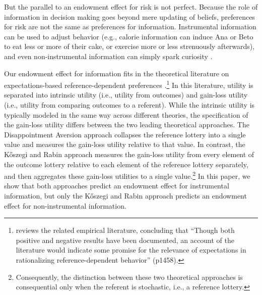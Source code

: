 But the parallel to an endowment effect for risk is not perfect. Because the role of information in decision making goes beyond mere updating of beliefs, preferences for risk are not the same as preferences for information. Instrumental information can be used to adjust behavior (e.g., calorie information can induce Ana or Beto to eat less or more of their cake, or exercise more or less strenuously afterwards), and even non-instrumental information can simply spark curiosity \citep{loewensteinPsychologyCuriosityReview1994,sharotHowPeopleDecide2020}.

Our endowment effect for information fits in the theoretical literature on expectations-based reference-dependent preferences \citep{marzilliericsonEndowmentEffect2014,odonoghueChapterReferenceDependentPreferences2018}.\footnote{\citet{sprengerEndowmentEffectRisk2015} reviews the related empirical literature, concluding that \enquote{Though both positive and negative results have been documented, an account of the literature would indicate some promise for the relevance of expectations in rationalizing reference-dependent behavior} (p1458).} In this literature, utility is separated into intrinsic utility (i.e., utility from outcomes) and gain-loss utility (i.e., utility from comparing outcomes to a referent). While the intrinsic utility is typically modeled in the same way across different theories, the specification of the gain-loss utility differs between the two leading theoretical approaches. The Disappointment Aversion approach \citep{bellDisappointmentDecisionMaking1985,loomesDisappointmentDynamicConsistency1986,gulTheoryDisappointmentAversion1991} collapses the reference lottery into a single value and measures the gain-loss utility relative to that value. In contrast, the  Kőszegi and Rabin approach \citep{koszegiModelReferenceDependentPreferences2006,koszegiReferenceDependentRiskAttitudes2007} measures the gain-loss utility from every element of the outcome lottery relative to each element of the reference lottery separately, and then aggregates these gain-loss utilities to a single value.\footnote{Consequently, the distinction between these two theoretical approaches is consequential only when the referent is stochastic, i.e., a reference lottery.}  In this paper, we show that both approaches predict an endowment effect for instrumental information, but only the Kőszegi and Rabin approach predicts an endowment effect for non-instrumental information.

